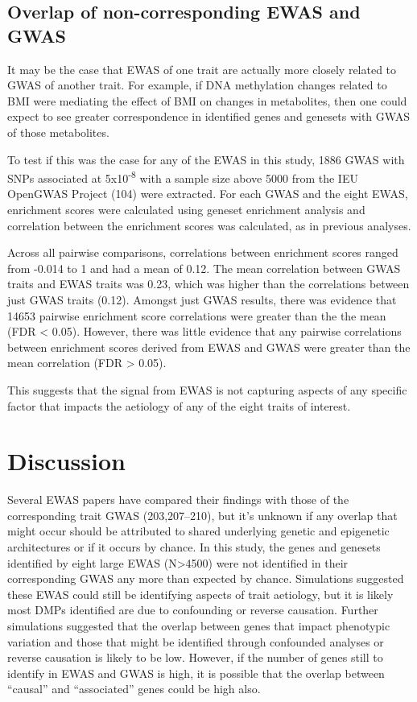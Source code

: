 \documentclass[11pt,twoside]{bristolthesis}
\begin{document}
\hypertarget{matching-gwas-to-ewas}{%
\subsection{Overlap of non-corresponding EWAS and GWAS}\label{matching-gwas-to-ewas}}

It may be the case that EWAS of one trait are actually more closely related to GWAS of another trait. For example, if DNA methylation changes related to BMI were mediating the effect of BMI on changes in metabolites, then one could expect to see greater correspondence in identified genes and genesets with GWAS of those metabolites.

To test if this was the case for any of the EWAS in this study, 1886 GWAS with SNPs associated at 5x10\textsuperscript{-8} with a sample size above 5000 from the IEU OpenGWAS Project (104) were extracted. For each GWAS and the eight EWAS, enrichment scores were calculated using geneset enrichment analysis and correlation between the enrichment scores was calculated, as in previous analyses.

Across all pairwise comparisons, correlations between enrichment scores ranged from -0.014 to 1 and had a mean of 0.12. The mean correlation between GWAS traits and EWAS traits was 0.23, which was higher than the correlations between just GWAS traits (0.12). Amongst just GWAS results, there was evidence that 14653 pairwise enrichment score correlations were greater than the the mean (FDR \textless{} 0.05). However, there was little evidence that any pairwise correlations between enrichment scores derived from EWAS and GWAS were greater than the mean correlation (FDR \textgreater{} 0.05).

This suggests that the signal from EWAS is not capturing aspects of any specific factor that impacts the aetiology of any of the eight traits of interest.

\hypertarget{discussion-06}{%
\section{Discussion}\label{discussion-06}}

Several EWAS papers have compared their findings with those of the corresponding trait GWAS (203,207--210), but it's unknown if any overlap that might occur should be attributed to shared underlying genetic and epigenetic architectures or if it occurs by chance. In this study, the genes and genesets identified by eight large EWAS (N\textgreater4500) were not identified in their corresponding GWAS any more than expected by chance. Simulations suggested these EWAS could still be identifying aspects of trait aetiology, but it is likely most DMPs identified are due to confounding or reverse causation. Further simulations suggested that the overlap between genes that impact phenotypic variation and those that might be identified through confounded analyses or reverse causation is likely to be low. However, if the number of genes still to identify in EWAS and GWAS is high, it is possible that the overlap between ``causal'' and ``associated'' genes could be high also.
\end{document}
